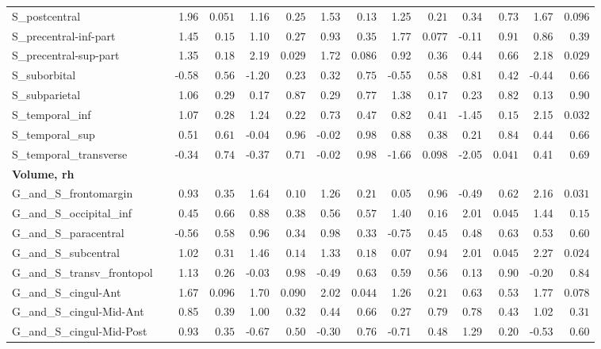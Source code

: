 {\begin{longtable}{llrrrrrrrrrrrr}
S\_postcentral &  & 1.96 & $0.051$ & 1.16 & $0.25$ & 1.53 & $0.13$ & 1.25 & $0.21$ & 0.34 & $0.73$ & 1.67 & $0.096$ \\
S\_precentral-inf-part &  & 1.45 & $0.15$ & 1.10 & $0.27$ & 0.93 & $0.35$ & 1.77 & $0.077$ & -0.11 & $0.91$ & 0.86 & $0.39$ \\
S\_precentral-sup-part &  & 1.35 & $0.18$ & 2.19 & $0.029$ & 1.72 & $0.086$ & 0.92 & $0.36$ & 0.44 & $0.66$ & 2.18 & $0.029$ \\
S\_suborbital &  & -0.58 & $0.56$ & -1.20 & $0.23$ & 0.32 & $0.75$ & -0.55 & $0.58$ & 0.81 & $0.42$ & -0.44 & $0.66$ \\
S\_subparietal &  & 1.06 & $0.29$ & 0.17 & $0.87$ & 0.29 & $0.77$ & 1.38 & $0.17$ & 0.23 & $0.82$ & 0.13 & $0.90$ \\
S\_temporal\_inf &  & 1.07 & $0.28$ & 1.24 & $0.22$ & 0.73 & $0.47$ & 0.82 & $0.41$ & -1.45 & $0.15$ & 2.15 & $0.032$ \\
S\_temporal\_sup &  & 0.51 & $0.61$ & -0.04 & $0.96$ & -0.02 & $0.98$ & 0.88 & $0.38$ & 0.21 & $0.84$ & 0.44 & $0.66$ \\
S\_temporal\_transverse &  & -0.34 & $0.74$ & -0.37 & $0.71$ & -0.02 & $0.98$ & -1.66 & $0.098$ & -2.05 & $0.041$ & 0.41 & $0.69$ \\
\midrule\multicolumn{14}{l}{\textbf{Volume, rh}} \\
G\_and\_S\_frontomargin &  & 0.93 & $0.35$ & 1.64 & $0.10$ & 1.26 & $0.21$ & 0.05 & $0.96$ & -0.49 & $0.62$ & 2.16 & $0.031$ \\
G\_and\_S\_occipital\_inf &  & 0.45 & $0.66$ & 0.88 & $0.38$ & 0.56 & $0.57$ & 1.40 & $0.16$ & 2.01 & $0.045$ & 1.44 & $0.15$ \\
G\_and\_S\_paracentral &  & -0.56 & $0.58$ & 0.96 & $0.34$ & 0.98 & $0.33$ & -0.75 & $0.45$ & 0.48 & $0.63$ & 0.53 & $0.60$ \\
G\_and\_S\_subcentral &  & 1.02 & $0.31$ & 1.46 & $0.14$ & 1.33 & $0.18$ & 0.07 & $0.94$ & 2.01 & $0.045$ & 2.27 & $0.024$ \\
G\_and\_S\_transv\_frontopol &  & 1.13 & $0.26$ & -0.03 & $0.98$ & -0.49 & $0.63$ & 0.59 & $0.56$ & 0.13 & $0.90$ & -0.20 & $0.84$ \\
G\_and\_S\_cingul-Ant &  & 1.67 & $0.096$ & 1.70 & $0.090$ & 2.02 & $0.044$ & 1.26 & $0.21$ & 0.63 & $0.53$ & 1.77 & $0.078$ \\
G\_and\_S\_cingul-Mid-Ant &  & 0.85 & $0.39$ & 1.00 & $0.32$ & 0.44 & $0.66$ & 0.27 & $0.79$ & 0.78 & $0.43$ & 1.02 & $0.31$ \\
G\_and\_S\_cingul-Mid-Post &  & 0.93 & $0.35$ & -0.67 & $0.50$ & -0.30 & $0.76$ & -0.71 & $0.48$ & 1.29 & $0.20$ & -0.53 & $0.60$ \\

\end{longtable}}
